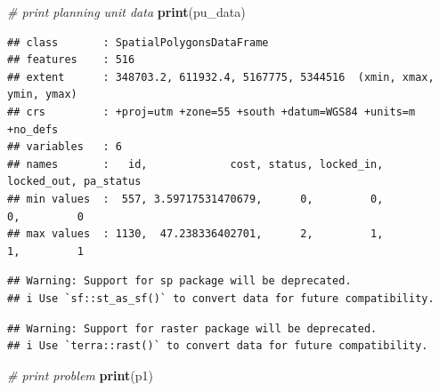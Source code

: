 \documentclass[12pt,]{book}
\newenvironment{Shaded}{\begin{snugshade}}{\end{snugshade}}
\newcommand{\CommentTok}[1]{\textcolor[rgb]{0.56,0.35,0.01}{\textit{#1}}}
\newcommand{\DataTypeTok}[1]{\textcolor[rgb]{0.13,0.29,0.53}{#1}}
\newcommand{\FloatTok}[1]{\textcolor[rgb]{0.00,0.00,0.81}{#1}}
\newcommand{\KeywordTok}[1]{\textcolor[rgb]{0.13,0.29,0.53}{\textbf{#1}}}
\newcommand{\NormalTok}[1]{#1}
\newcommand{\OperatorTok}[1]{\textcolor[rgb]{0.81,0.36,0.00}{\textbf{#1}}}
\newcommand{\OtherTok}[1]{\textcolor[rgb]{0.56,0.35,0.01}{#1}}
\newcommand{\StringTok}[1]{\textcolor[rgb]{0.31,0.60,0.02}{#1}}
\begin{document}
\begin{Shaded}
\begin{Highlighting}[]
\CommentTok{# print planning unit data}
\KeywordTok{print}\NormalTok{(pu_data)}
\end{Highlighting}
\end{Shaded}

\begin{verbatim}
## class       : SpatialPolygonsDataFrame 
## features    : 516 
## extent      : 348703.2, 611932.4, 5167775, 5344516  (xmin, xmax, ymin, ymax)
## crs         : +proj=utm +zone=55 +south +datum=WGS84 +units=m +no_defs 
## variables   : 6
## names       :   id,             cost, status, locked_in, locked_out, pa_status 
## min values  :  557, 3.59717531470679,      0,         0,          0,         0 
## max values  : 1130,  47.238336402701,      2,         1,          1,         1
\end{verbatim}

\begin{Shaded}
\end{Shaded}

\begin{verbatim}
## Warning: Support for sp package will be deprecated.
## i Use `sf::st_as_sf()` to convert data for future compatibility.
\end{verbatim}

\begin{verbatim}
## Warning: Support for raster package will be deprecated.
## i Use `terra::rast()` to convert data for future compatibility.
\end{verbatim}

\begin{Shaded}
\begin{Highlighting}[]
\CommentTok{# print problem}
\KeywordTok{print}\NormalTok{(p1)}
\end{Highlighting}
\end{Shaded}
\end{document}

